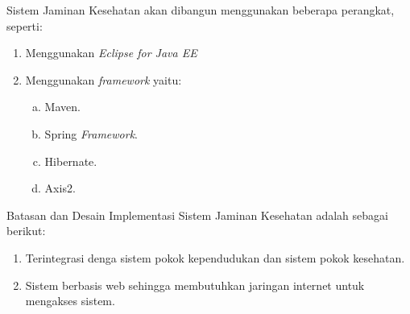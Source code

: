 Sistem Jaminan Kesehatan akan dibangun menggunakan beberapa perangkat, seperti:
\begin{enumerate}[1.]
	\item Menggunakan \textit{Eclipse for Java EE}
	\item Menggunakan \textit{framework} yaitu:
	\begin{enumerate}[a.]
		\item Maven. 
		\item Spring \textit{Framework}.
		\item Hibernate.
		\item Axis2.
	\end{enumerate}
\end{enumerate}
\par
Batasan dan Desain Implementasi Sistem Jaminan Kesehatan adalah sebagai berikut:
\begin{enumerate}
	\item Terintegrasi denga sistem pokok kependudukan dan sistem pokok kesehatan.
	\item Sistem berbasis web sehingga membutuhkan jaringan internet untuk mengakses sistem.
\end{enumerate}